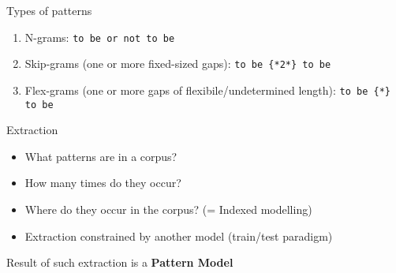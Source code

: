 \documentclass[compress]{beamer}
\begin{document}
\begin{frame}

  \begin{block}{Types of patterns}
    \begin{enumerate}
      \item N-grams: \verb|to be or not to be|
      \item Skip-grams (one or more fixed-sized gaps): \verb|to be {*2*} to be|
      \item Flex-grams (one or more gaps of flexibile/undetermined length): \verb|to be {*} to be|
    \end{enumerate}
  \end{block}
\end{frame}


\begin{frame}
  \begin{block}{Extraction}
    \begin{itemize}
      \item What patterns are in a corpus? 
      \item How many times do they occur?
      \item Where do they occur in the corpus? (= Indexed modelling)
      \item Extraction constrained by another model (train/test paradigm)
    \end{itemize}

    Result of such extraction is a \textbf{Pattern Model}
  \end{block}
\end{frame}
\end{document}
